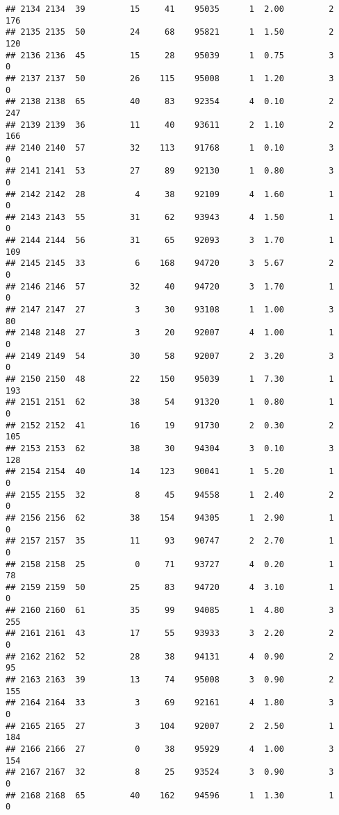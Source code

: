\documentclass[
]{article}
\begin{document}
\begin{verbatim}
## 2134 2134  39         15     41    95035      1  2.00         2      176
## 2135 2135  50         24     68    95821      1  1.50         2      120
## 2136 2136  45         15     28    95039      1  0.75         3        0
## 2137 2137  50         26    115    95008      1  1.20         3        0
## 2138 2138  65         40     83    92354      4  0.10         2      247
## 2139 2139  36         11     40    93611      2  1.10         2      166
## 2140 2140  57         32    113    91768      1  0.10         3        0
## 2141 2141  53         27     89    92130      1  0.80         3        0
## 2142 2142  28          4     38    92109      4  1.60         1        0
## 2143 2143  55         31     62    93943      4  1.50         1        0
## 2144 2144  56         31     65    92093      3  1.70         1      109
## 2145 2145  33          6    168    94720      3  5.67         2        0
## 2146 2146  57         32     40    94720      3  1.70         1        0
## 2147 2147  27          3     30    93108      1  1.00         3       80
## 2148 2148  27          3     20    92007      4  1.00         1        0
## 2149 2149  54         30     58    92007      2  3.20         3        0
## 2150 2150  48         22    150    95039      1  7.30         1      193
## 2151 2151  62         38     54    91320      1  0.80         1        0
## 2152 2152  41         16     19    91730      2  0.30         2      105
## 2153 2153  62         38     30    94304      3  0.10         3      128
## 2154 2154  40         14    123    90041      1  5.20         1        0
## 2155 2155  32          8     45    94558      1  2.40         2        0
## 2156 2156  62         38    154    94305      1  2.90         1        0
## 2157 2157  35         11     93    90747      2  2.70         1        0
## 2158 2158  25          0     71    93727      4  0.20         1       78
## 2159 2159  50         25     83    94720      4  3.10         1        0
## 2160 2160  61         35     99    94085      1  4.80         3      255
## 2161 2161  43         17     55    93933      3  2.20         2        0
## 2162 2162  52         28     38    94131      4  0.90         2       95
## 2163 2163  39         13     74    95008      3  0.90         2      155
## 2164 2164  33          3     69    92161      4  1.80         3        0
## 2165 2165  27          3    104    92007      2  2.50         1      184
## 2166 2166  27          0     38    95929      4  1.00         3      154
## 2167 2167  32          8     25    93524      3  0.90         3        0
## 2168 2168  65         40    162    94596      1  1.30         1        0

\end{verbatim}
\end{document}
